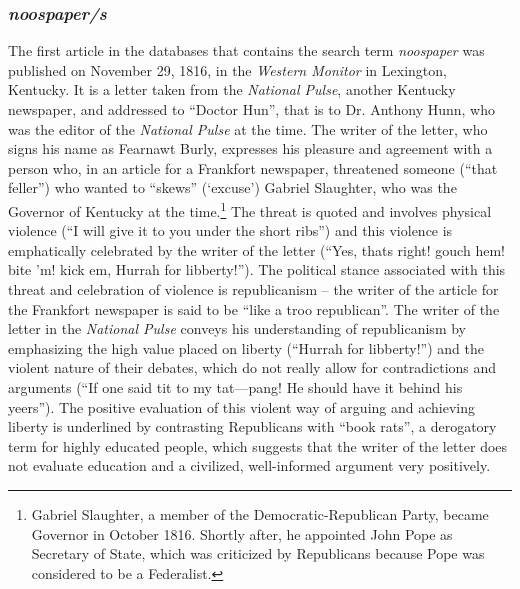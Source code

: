 \subsubsection{\emph{noospaper/s}}
\hypertarget{Toc63021239}{}
The first article in the databases that contains the search term \emph{noospaper} was published on November 29, 1816, in the \emph{Western Monitor} in Lexington, Kentucky. It is a letter taken from the \emph{National Pulse}, another Kentucky newspaper, and addressed to “Doctor Hun”, that is to Dr. Anthony Hunn, who was the editor of the \emph{National Pulse} at the time. The writer of the letter, who signs his name as Fearnawt Burly, expresses his pleasure and agreement with a person who, in an article for a Frankfort newspaper, threatened someone (“that feller”) who wanted to “skews” (‘excuse’) Gabriel Slaughter, who was the Governor of Kentucky at the time.\footnote{Gabriel Slaughter, a member of the Democratic-Republican Party, became Governor in October 1816. Shortly after, he appointed John Pope as Secretary of State, which was criticized by Republicans because Pope was considered to be a Federalist.} The threat is quoted and involves physical violence (“I will give it to you under the short ribs”) and this violence is emphatically celebrated by the writer of the letter (“Yes, thats right! gouch hem! bite ’m! kick em, Hurrah for libberty!”). The political stance associated with this threat and celebration of violence is republicanism – the writer of the article for the Frankfort newspaper is said to be “like a troo republican”. The writer of the letter in the \emph{National Pulse} conveys his understanding of republicanism by emphasizing the high value placed on liberty (“Hurrah for libberty!”) and the violent nature of their debates, which do not really allow for contradictions and arguments (“If one said tit to my tat—pang! He should have it behind his yeers”). The positive evaluation of this violent way of arguing and achieving liberty is underlined by contrasting Republicans with “book rats”, a derogatory term for highly educated people, which suggests that the writer of the letter does not evaluate education and a civilized, well-informed argument very positively.


